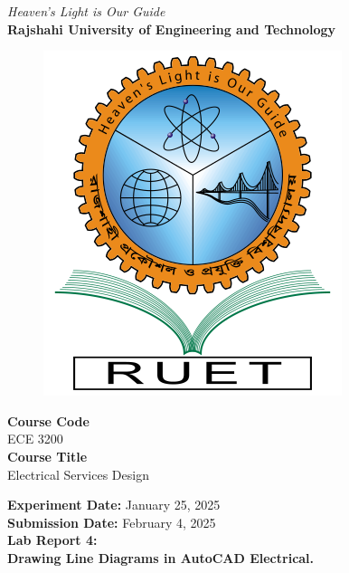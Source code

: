 \vspace*{\fill}
\begin{center}

    \emph{Heaven's Light is Our Guide} \\
    \textbf{Rajshahi University of Engineering and Technology} \\

    \begin{figure}[H]
        \centering
        \includegraphics[scale=.34]{images/RUET_logo.png}
        \label{fig:ruet_logo}
    \end{figure}
    \vspace{5mm}

    \textbf{Course Code}\\
    ECE 3200\\
    \vspace{3mm}
    \textbf{Course Title}\\
    Electrical Services Design

    \vspace{5mm}
    \textbf{Experiment Date:} {January 25, 2025}\\
    \textbf{Submission Date:} {February 4, 2025}\\

    \vspace{5mm}
    \textbf{Lab Report 4: \\ Drawing Line Diagrams in AutoCAD Electrical.}

    \vspace{15mm}


\end{center}
